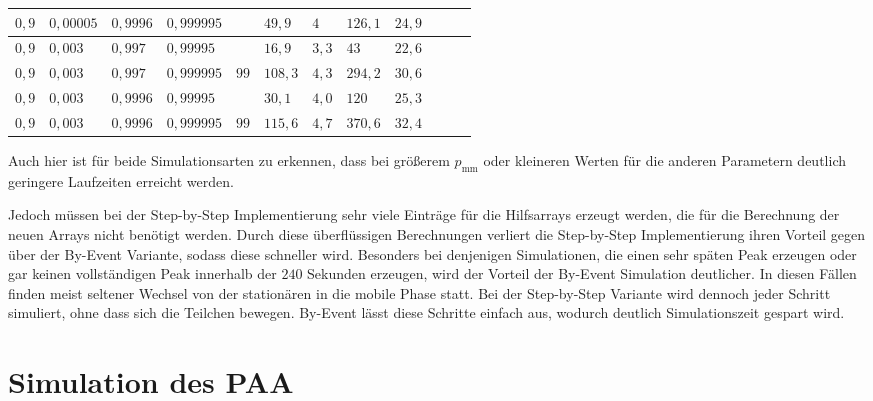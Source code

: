 \begin{table}[h]
\begin{tabular}{|l|l|l|l||l||l|l|l|l|l|l|l|}
$ 0,9  $ & $0,00005$ & $0,9996$ & $0,999995$ && $49,9   $ & $4 $     & $126,1 $ & $24,9 $  \\ \hline
$ 0,9  $ & $0,003 $  & $0,997$  & $0,99995$  && $16,9   $ & $3,3 $   & $43    $ & $22,6 $  \\ \hline
\cellcolor{gray!25}$ 0,9  $ & \cellcolor{gray!25}$0,003 $  & \cellcolor{gray!25}$0,997$  & \cellcolor{gray!25}$0,999995$ &$99$& $108,3$ & $4,3   $ & $294,2 $ & $30,6 $  \\ \hline
$ 0,9  $ & $0,003 $  & $0,9996$ & $0,99995$  && $30,1   $ & $4,0 $   & $120 $   & $25,3 $  \\ \hline
\cellcolor{gray!25}$ 0,9  $ & \cellcolor{gray!25}$0,003 $  & \cellcolor{gray!25}$0,9996$ & \cellcolor{gray!25}$0,999995$ &$99$& $115,6$ & $4,7   $ & $370,6 $ & $32,4$  \\ \hline
\end{tabular}
\end{table}
Auch hier ist für beide Simulationsarten zu erkennen, dass bei größerem $p_\text{mm}$ oder kleineren Werten für die anderen Parametern deutlich geringere Laufzeiten erreicht werden.

Jedoch müssen bei der Step-by-Step Implementierung sehr viele Einträge für die Hilfsarrays erzeugt werden, die für die Berechnung der neuen Arrays nicht benötigt werden. Durch diese überflüssigen Berechnungen verliert die Step-by-Step Implementierung ihren Vorteil gegen über der By-Event Variante, sodass diese schneller wird. Besonders bei denjenigen Simulationen, die einen sehr späten Peak erzeugen oder gar keinen vollständigen Peak innerhalb der $240$ Sekunden erzeugen, wird der Vorteil der By-Event Simulation deutlicher. In diesen Fällen finden meist seltener Wechsel von der stationären in die mobile Phase statt. Bei der Step-by-Step Variante wird dennoch jeder Schritt simuliert, ohne dass sich die Teilchen bewegen. By-Event lässt diese Schritte einfach aus, wodurch deutlich Simulationszeit gespart wird. 

\section{Simulation des PAA}

